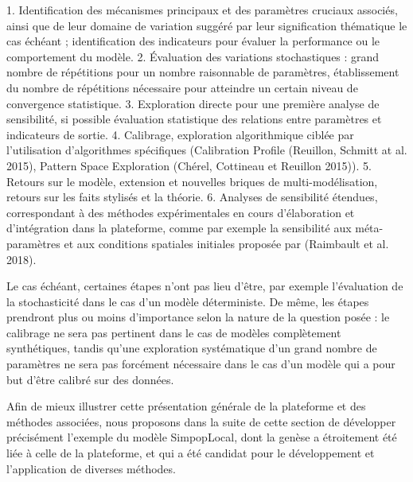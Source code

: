 \documentclass[10pt]{article}
\begin{document}
1.  Identification des mécanismes principaux et des paramètres cruciaux associés, ainsi que de leur domaine de variation suggéré par leur signification thématique le cas échéant ; identification des indicateurs pour évaluer la performance ou le comportement du modèle.
2. Évaluation des variations stochastiques : grand nombre de répétitions pour un nombre raisonnable de paramètres, établissement du nombre de répétitions nécessaire pour atteindre un certain niveau de convergence statistique.
3. Exploration directe pour une première analyse de sensibilité, si possible évaluation statistique des relations entre paramètres et indicateurs de sortie.
4. Calibrage, exploration algorithmique ciblée par l’utilisation d’algorithmes spécifiques (Calibration Profile (Reuillon, Schmitt at al. 2015), Pattern Space Exploration (Chérel, Cottineau et Reuillon 2015)).
5. Retours sur le modèle, extension et nouvelles briques de multi-modélisation, retours sur les faits stylisés et la théorie. 
6. Analyses de sensibilité étendues, correspondant à des méthodes expérimentales en cours d'élaboration et d'intégration dans la plateforme, comme par exemple la sensibilité aux méta-paramètres et aux conditions spatiales initiales proposée par (Raimbault et al. 2018).

Le cas échéant, certaines étapes n’ont pas lieu d’être, par exemple l’évaluation de la stochasticité dans le cas d’un modèle déterministe. De même, les étapes prendront plus ou moins d’importance selon la nature de la question posée : le calibrage ne sera pas pertinent dans le cas de modèles complètement synthétiques, tandis qu’une exploration systématique d’un grand nombre de paramètres ne sera pas forcément nécessaire dans le cas d’un modèle qui a pour but d’être calibré sur des données.

Afin de mieux illustrer cette présentation générale de la plateforme et des méthodes associées, nous proposons dans la suite de cette section de développer précisément l’exemple du modèle SimpopLocal, dont la genèse a étroitement été liée à celle de la plateforme, et qui a été candidat pour le développement et l’application de diverses méthodes.
\end{document}
